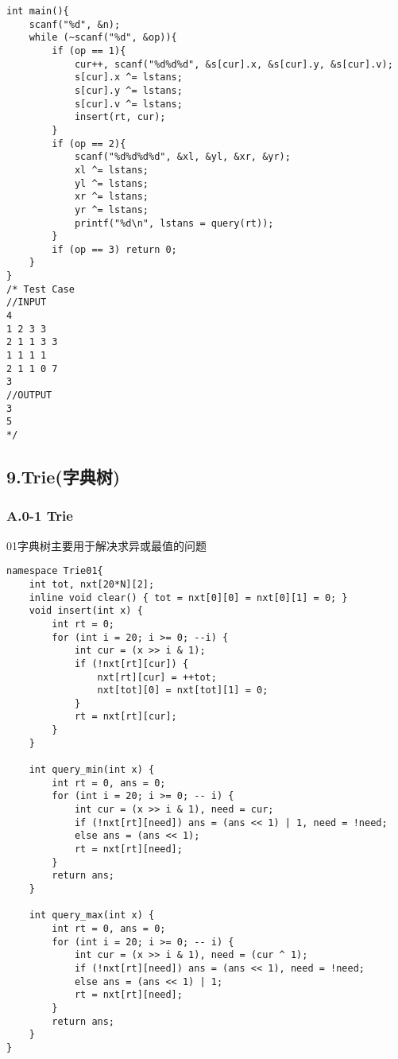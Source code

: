 \documentclass[]{article}
\begin{document}
\begin{verbatim}
int main(){
    scanf("%d", &n);
    while (~scanf("%d", &op)){
        if (op == 1){
            cur++, scanf("%d%d%d", &s[cur].x, &s[cur].y, &s[cur].v);
            s[cur].x ^= lstans;
            s[cur].y ^= lstans;
            s[cur].v ^= lstans;
            insert(rt, cur);
        }
        if (op == 2){
            scanf("%d%d%d%d", &xl, &yl, &xr, &yr);
            xl ^= lstans;
            yl ^= lstans;
            xr ^= lstans;
            yr ^= lstans;
            printf("%d\n", lstans = query(rt));
        }
        if (op == 3) return 0;
    }
}
/* Test Case
//INPUT
4
1 2 3 3
2 1 1 3 3
1 1 1 1
2 1 1 0 7
3
//OUTPUT
3
5
*/
\end{verbatim}

\hypertarget{trieux5b57ux5178ux6811}{%
\subsection{9.Trie(字典树)}\label{trieux5b57ux5178ux6811}}

\hypertarget{a.0-1-trie}{%
\subsubsection{A.0-1 Trie}\label{a.0-1-trie}}

01字典树主要用于解决求异或最值的问题

\begin{verbatim}
namespace Trie01{
    int tot, nxt[20*N][2];
    inline void clear() { tot = nxt[0][0] = nxt[0][1] = 0; }
    void insert(int x) {
        int rt = 0;
        for (int i = 20; i >= 0; --i) {
            int cur = (x >> i & 1);
            if (!nxt[rt][cur]) {
                nxt[rt][cur] = ++tot;
                nxt[tot][0] = nxt[tot][1] = 0;    
            }
            rt = nxt[rt][cur];
        }
    }

    int query_min(int x) {
        int rt = 0, ans = 0;
        for (int i = 20; i >= 0; -- i) {
            int cur = (x >> i & 1), need = cur;
            if (!nxt[rt][need]) ans = (ans << 1) | 1, need = !need;
            else ans = (ans << 1);
            rt = nxt[rt][need];
        }
        return ans;
    }

    int query_max(int x) {
        int rt = 0, ans = 0;
        for (int i = 20; i >= 0; -- i) {
            int cur = (x >> i & 1), need = (cur ^ 1);
            if (!nxt[rt][need]) ans = (ans << 1), need = !need;
            else ans = (ans << 1) | 1;
            rt = nxt[rt][need];
        }
        return ans;
    }
}
\end{verbatim}
\end{document}
